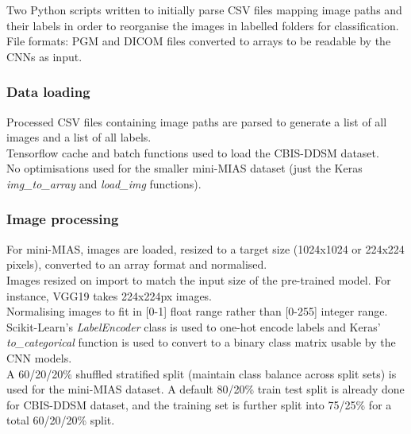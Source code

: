 Two Python scripts written to initially parse CSV files mapping image paths and their labels in order to reorganise the images in labelled folders for classification.\\

File formats: PGM and DICOM files converted to arrays to be readable by the CNNs as input.\\


\subsubsection{Data loading}

Processed CSV files containing image paths are parsed to generate a list of all images and a list of all labels.\\

Tensorflow cache and batch functions used to load the CBIS-DDSM dataset.\\

No optimisations used for the smaller mini-MIAS dataset (just the Keras \textit{img\_to\_array} and \textit{load\_img} functions).\\


\subsubsection{Image processing}

For mini-MIAS, images are loaded, resized to a target size (1024x1024 or 224x224 pixels), converted to an array format and normalised.\\

Images resized on import to match the input size of the pre-trained model. For instance, VGG19 takes 224x224px images.\\

Normalising images to fit in [0-1] float range rather than [0-255] integer range.\\

Scikit-Learn's \textit{LabelEncoder} class is used to one-hot encode labels and Keras' \textit{to\_categorical}  function is used to convert to a binary class matrix usable by the CNN models.\\

A 60/20/20\% shuffled stratified split (maintain class balance across split sets) is used for the mini-MIAS dataset. A default 80/20\% train test split is already done for CBIS-DDSM dataset, and the training set is further split into 75/25\% for a total 60/20/20\% split.\\

